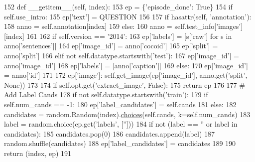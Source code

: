 \begin{DoxyCode}
152     \textcolor{keyword}{def }\_\_getitem\_\_(self, index):
153         ep = \{\textcolor{stringliteral}{'episode\_done'}: \textcolor{keyword}{True}\}
154         \textcolor{keywordflow}{if} self.use\_intro:
155             ep[\textcolor{stringliteral}{'text'}] = QUESTION
156 
157         \textcolor{keywordflow}{if} hasattr(self, \textcolor{stringliteral}{'annotation'}):
158             anno = self.annotation[index]
159         \textcolor{keywordflow}{else}:
160             anno = self.test\_info[\textcolor{stringliteral}{'images'}][index]
161 
162         \textcolor{keywordflow}{if} self.version == \textcolor{stringliteral}{'2014'}:
163             ep[\textcolor{stringliteral}{'labels'}] = [s[\textcolor{stringliteral}{'raw'}] \textcolor{keywordflow}{for} s \textcolor{keywordflow}{in} anno[\textcolor{stringliteral}{'sentences'}]]
164             ep[\textcolor{stringliteral}{'image\_id'}] = anno[\textcolor{stringliteral}{'cocoid'}]
165             ep[\textcolor{stringliteral}{'split'}] = anno[\textcolor{stringliteral}{'split'}]
166         \textcolor{keywordflow}{elif} \textcolor{keywordflow}{not} self.datatype.startswith(\textcolor{stringliteral}{'test'}):
167             ep[\textcolor{stringliteral}{'image\_id'}] = anno[\textcolor{stringliteral}{'image\_id'}]
168             ep[\textcolor{stringliteral}{'labels'}] = [anno[\textcolor{stringliteral}{'caption'}]]
169         \textcolor{keywordflow}{else}:
170             ep[\textcolor{stringliteral}{'image\_id'}] = anno[\textcolor{stringliteral}{'id'}]
171 
172         ep[\textcolor{stringliteral}{'image'}]: self.get\_image(ep[\textcolor{stringliteral}{'image\_id'}], anno.get(\textcolor{stringliteral}{'split'}, \textcolor{keywordtype}{None}))
173 
174         \textcolor{keywordflow}{if} self.opt.get(\textcolor{stringliteral}{'extract\_image'}, \textcolor{keyword}{False}):
175             \textcolor{keywordflow}{return} ep
176 
177         \textcolor{comment}{# Add Label Cands}
178         \textcolor{keywordflow}{if} \textcolor{keywordflow}{not} self.datatype.startswith(\textcolor{stringliteral}{'train'}):
179             \textcolor{keywordflow}{if} self.num\_cands == -1:
180                 ep[\textcolor{stringliteral}{'label\_candidates'}] = self.cands
181             \textcolor{keywordflow}{else}:
182                 candidates = random.Random(index).\hyperlink{namespaceparlai_1_1mturk_1_1tasks_1_1personachat_1_1personachat__chat_1_1extract__and__save__personas_a2def58d59437334ec072a3d644c0a577}{choices}(self.cands, k=self.num\_cands)
183                 label = random.choice(ep.get(\textcolor{stringliteral}{'labels'}, [\textcolor{stringliteral}{''}]))
184                 \textcolor{keywordflow}{if} \textcolor{keywordflow}{not} (label == \textcolor{stringliteral}{''} \textcolor{keywordflow}{or} label \textcolor{keywordflow}{in} candidates):
185                     candidates.pop(0)
186                     candidates.append(label)
187                     random.shuffle(candidates)
188                 ep[\textcolor{stringliteral}{'label\_candidates'}] = candidates
189 
190         \textcolor{keywordflow}{return} (index, ep)
191 
\end{DoxyCode}
